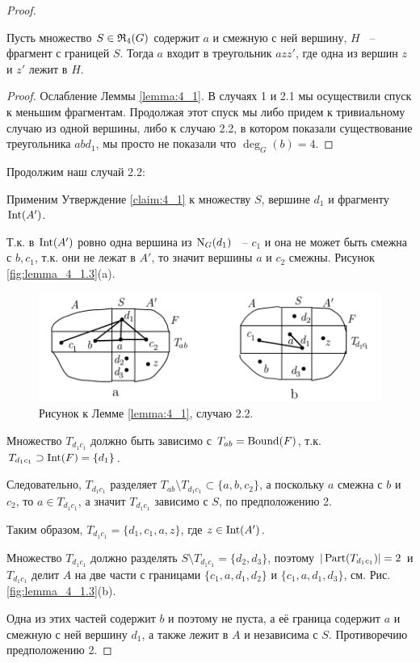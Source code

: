 \begin{proof}
\begin{itemize}
	\end{itemize}


\begin{customclaim}{4.1} \label{claim:4_1}
	Пусть множество $S \in \mathfrak{R}_4(G)$ содержит $a$ и смежную с ней вершину, $H$ ~-- фрагмент с границей $S$. Тогда $a$ входит в треугольник $azz'$, где одна из вершин $z$ и $z'$ лежит в $H$.
\end{customclaim}

\begin{proof}
	Ослабление Леммы \ref{lemma:4_1}.
	В случаях 1 и 2.1 мы осуществили спуск к меньшим фрагментам. Продолжая этот спуск мы либо придем к тривиальному случаю из одной вершины, либо к случаю 2.2, в котором показали существование треугольника $abd_1$, мы просто не показали что $\deg_G(b) = 4$.
\end{proof}

Продолжим наш случай 2.2:

Применим Утверждение \ref{claim:4_1} к множеству $S$, вершине  $d_1$ и фрагменту $\operatorname{Int}(A')$.

Т.к. в  $\operatorname{Int}(A')$ ровно одна вершина из $\operatorname{N}_G(d_1)$ ~-- $c_1$ и она не может быть смежна с $b, c_1$, т.к. они не лежат в $A'$, то значит вершины  $a$ и  $c_2$ смежны. Рисунок \eqref{fig:lemma_4_1.3}(a).

	\begin{figure}[ht]
    \centering
	\includegraphics[width=0.5\columnwidth]{figures/lemma_4_1.3.png}
	\caption{Рисунок к Лемме \ref{lemma:4_1}, случаю 2.2.}
    \label{fig:lemma_4_1.3}
	\end{figure}

	Множество $T_{d_1c_1}$ должно быть зависимо с $T_{ab} = \operatorname{Bound}(F)$, т.к. $T_{d_1c_1} \supset \operatorname{Int}(F) = \{d_1\}$.

	Следовательно, $T_{d_1c_1}$ разделяет $T_{ab} \setminus T_{d_1c_1} \subset \{a, b, c_2\}$, а поскольку $a$ смежна с $b$ и $c_2$, то $a \in T_{d_1 c_1}$, а значит $T_{d_1c_1}$ зависимо с $S$, по предположению 2.

	Таким образом,  $T_{d_1 c_1} = \{d_1, c_1, a, z\}$, где $z \in \operatorname{Int}(A')$.

	Множество  $T_{d_1c_1}$ должно разделять $S \setminus T_{d_1c_1} = \{d_2, d_3\}$, поэтому $|\operatorname{Part}(T_{d_1c_1})| = 2$ и $T_{d_1c_1}$ делит $A$ на две части с границами $\{c_1, a, d_1, d_2\}$ и $\{c_1, a, d_1, d_3\}$, см. Рис. \eqref{fig:lemma_4_1.3}(b).

	Одна из этих частей содержит $b$ и поэтому не пуста, а её граница содержит $a$ и смежную с ней вершину $d_1$, а также лежит в $A$ и независима с $S$. Противоречию предположению 2.

\end{proof}

